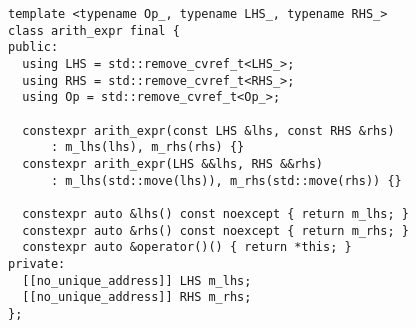 \begin{lstlisting}[basicstyle=\small\ttfamily]
template <typename Op_, typename LHS_, typename RHS_>
class arith_expr final {
public:
  using LHS = std::remove_cvref_t<LHS_>;
  using RHS = std::remove_cvref_t<RHS_>;
  using Op = std::remove_cvref_t<Op_>;

  constexpr arith_expr(const LHS &lhs, const RHS &rhs)
      : m_lhs(lhs), m_rhs(rhs) {}
  constexpr arith_expr(LHS &&lhs, RHS &&rhs)
      : m_lhs(std::move(lhs)), m_rhs(std::move(rhs)) {}

  constexpr auto &lhs() const noexcept { return m_lhs; }
  constexpr auto &rhs() const noexcept { return m_rhs; }
  constexpr auto &operator()() { return *this; }
private:
  [[no_unique_address]] LHS m_lhs;
  [[no_unique_address]] RHS m_rhs;
};
\end{lstlisting}
